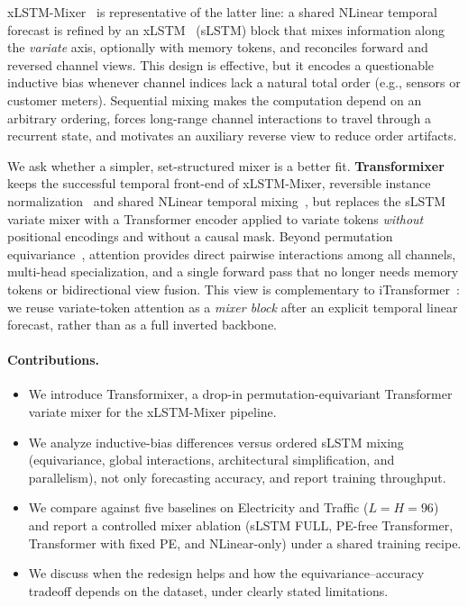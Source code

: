 \documentclass{article}
\begin{document}
xLSTM-Mixer~\citep{kraus2024xlstmmixer} is representative of the latter line: a shared NLinear temporal forecast is refined by an xLSTM~\citep{beck2024xlstm} (sLSTM) block that mixes information along the \emph{variate} axis, optionally with memory tokens, and reconciles forward and reversed channel views.
This design is effective, but it encodes a questionable inductive bias whenever channel indices lack a natural total order (e.g., sensors or customer meters).
Sequential mixing makes the computation depend on an arbitrary ordering, forces long-range channel interactions to travel through a recurrent state, and motivates an auxiliary reverse view to reduce order artifacts.

We ask whether a simpler, set-structured mixer is a better fit.
\textbf{Transformixer} keeps the successful temporal front-end of xLSTM-Mixer, reversible instance normalization~\citep{kim2021revin} and shared NLinear temporal mixing~\citep{zeng2023dlinear}, but replaces the sLSTM variate mixer with a Transformer encoder applied to variate tokens \emph{without} positional encodings and without a causal mask.
Beyond permutation equivariance~\citep{zaheer2017deepsets}, attention provides direct pairwise interactions among all channels, multi-head specialization, and a single forward pass that no longer needs memory tokens or bidirectional view fusion.
This view is complementary to iTransformer~\citep{liu2024itransformer}: we reuse variate-token attention as a \emph{mixer block} after an explicit temporal linear forecast, rather than as a full inverted backbone.

\paragraph{Contributions.}
\begin{itemize}
  \item We introduce Transformixer, a drop-in permutation-equivariant Transformer variate mixer for the xLSTM-Mixer pipeline.
  \item We analyze inductive-bias differences versus ordered sLSTM mixing (equivariance, global interactions, architectural simplification, and parallelism), not only forecasting accuracy, and report training throughput.
  \item We compare against five baselines on Electricity and Traffic ($L{=}H{=}96$) and report a controlled mixer ablation (sLSTM FULL, PE-free Transformer, Transformer with fixed PE, and NLinear-only) under a shared training recipe.
  \item We discuss when the redesign helps and how the equivariance--accuracy tradeoff depends on the dataset, under clearly stated limitations.
\end{itemize}
\end{document}
